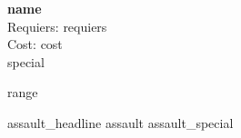 {{\bf {name} }} \\

Requiers: {requiers} \\
Cost: {cost} \\
{special}

{range}

{assault_headline}
{assault}
{assault_special}
